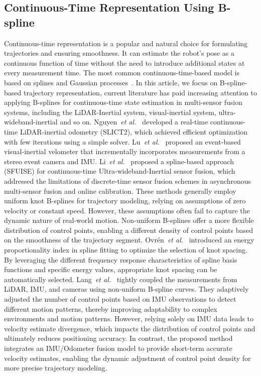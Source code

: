 \subsection{Continuous-Time Representation Using B-spline}
Continuous-time representation is a popular and natural choice for formulating trajectories and ensuring smoothness. 
It can estimate the robot's pose as a continuous function of time without the need to introduce additional states at every measurement time. The most common continuous-time-based model is based on splines and Gaussian processes~\cite{cioffi2022continuous}. 
In this article, we focus on B-spline-based trajectory representation,  current literature has paid increasing attention to applying B-splines for continuous-time state estimation in multi-sensor fusion systems, including the LiDAR-Inertial system, visual-inertial system, ultra-wideband-inertial and so on.
Nguyen~\textit{et al.}~\cite{nguyen2024eigen} developed a real-time continuous-time LiDAR-inertial odometry (SLICT2), which achieved efficient optimization with few iterations using a simple solver.
Lu~\textit{et al.}~\cite{lu2023event} proposed an event-based visual-inertial velometer that incrementally incorporates measurements from a stereo event camera and IMU. 
Li~\textit{et al.}~\cite{li2023continuous} proposed a spline-based approach (SFUISE) for continuous-time Ultra-wideband-Inertial sensor fusion, which addressed the limitations of discrete-time sensor fusion schemes in asynchronous multi-sensor fusion and online calibration. 
These methods generally employ uniform knot B-splines for trajectory modeling, relying on assumptions of zero velocity or constant speed. However, these assumptions often fail to capture the dynamic nature of real-world motion. Non-uniform B-splines offer a more flexible distribution of control points, enabling a different density of control points based on the smoothness of the trajectory segment. 
Ovrén~\textit{et al.}~\cite{ovren2018spline} introduced an energy proportionality index in spline fitting to optimize the selection of knot spacing. 
By leveraging the different frequency response characteristics of spline basis functions and specific energy values, appropriate knot spacing can be automatically selected. 
Lang~\textit{et al.}~\cite{lang2023coco} tightly coupled the measurements from LiDAR, IMU, and cameras using non-uniform B-spline curves. 
They adaptively adjusted the number of control points based on IMU observations to detect different motion patterns, thereby improving adaptability to complex environments and motion patterns. However, relying solely on IMU data leads to velocity estimate divergence, which impacts the distribution of control points and ultimately reduces positioning accuracy. 
In contrast, the proposed method integrates an IMU/Odometer fusion model to provide short-term accurate velocity estimates, enabling the dynamic adjustment of control point density for more precise trajectory modeling. 

